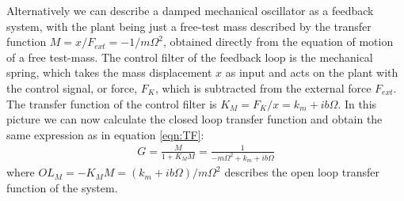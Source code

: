 Alternatively we can describe a damped mechanical oscillator as a feedback system,  with the plant being just a free-test mass described by the transfer function 
$M=x/F_{ext}=-1/m\Omega^2$,
obtained directly from the equation of motion of a free test-mass. 
The control filter of the feedback loop is the mechanical spring, which takes the mass displacement $x$ as input and acts on the plant with the control signal, or force, $F_K$, which is subtracted from the external force $F_{ext}$.
The transfer function of the control filter is $K_M=F_{K}/x=k_m+ib\Omega$. In this picture we can now calculate the closed loop transfer function and obtain the same expression as in equation \ref{eqn:TF}:
\begin{eqnarray}
\label{eqn:TF_fm}
G=\frac{M}{1+K_M M}=
\frac{1}{-m\Omega^2+k_m+ib\Omega}
\end{eqnarray}
where $OL_M=-K_M  M = (k_m+ib\Omega)/m\Omega^2$ describes the open loop transfer function of the system.


